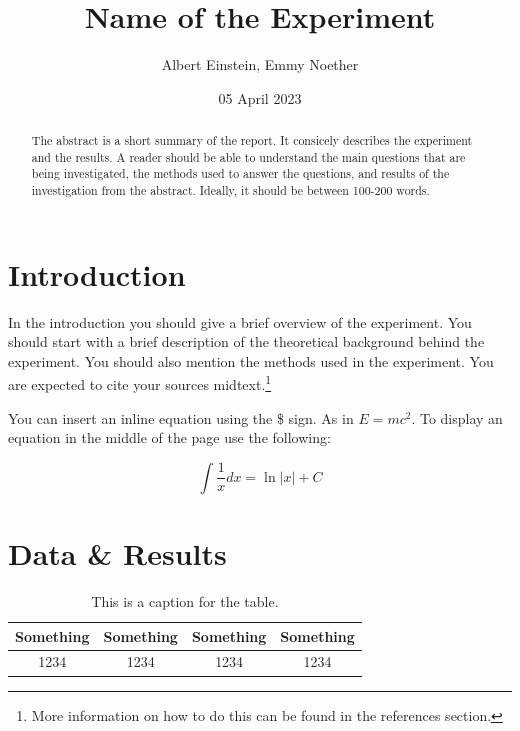 \documentclass[10pt]{article}
\title{Name of the Experiment} %
\author{Albert Einstein, Emmy Noether} %
\date{05 April 2023} %
\begin{document}
\maketitle

\begin{abstract}
The abstract is a short summary of the report. It consicely describes the experiment and the results. A reader should be able to understand the main questions that are being investigated, the methods used to answer the questions, and results of the investigation from the abstract. Ideally, it should be between 100-200 words.

\end{abstract}

\section{Introduction}

In the introduction you should give a brief overview of the experiment. You should start with a brief description of the theoretical background behind the experiment. You should also mention the methods used in the experiment. You are expected to cite your sources\cite{Bravyi_2020} midtext.\footnote{More information on how to do this can be found in the references section.}


You can insert an inline equation using the \$ sign. As in $E=mc^2$. To display an equation in the middle of the page use the following:

\begin{equation}
    \int \frac{1}{x} dx = \ln|x| + C
\end{equation}

\section{Data \& Results}

\begin{table}[ht]
    \centering
    \begin{tabular}{|c|c|c|c|}
        \hline
        Something & Something & Something & Something \\
        \hline
        1234 & 1234 & 1234 & 1234 \\
        \hline
    \end{tabular}
    \caption{This is a caption for the table.}
    \label{tab:ex}
\end{table}
\end{document}
